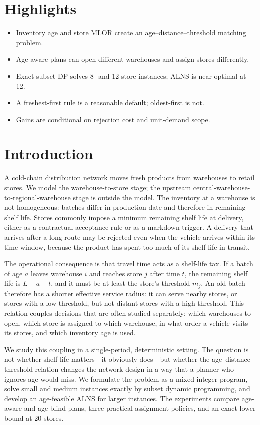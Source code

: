 \documentclass[preprint,12pt]{elsarticle}
\begin{document}
\section*{Highlights}
\begin{itemize}
\item Inventory age and store MLOR create an age--distance--threshold matching problem.
\item Age-aware plans can open different warehouses and assign stores differently.
\item Exact subset DP solves 8- and 12-store instances; ALNS is near-optimal at 12.
\item A freshest-first rule is a reasonable default; oldest-first is not.
\item Gains are conditional on rejection cost and unit-demand scope.
\end{itemize}

\section{Introduction}

A cold-chain distribution network moves fresh products from warehouses to retail stores. We model the warehouse-to-store stage; the upstream central-warehouse-to-regional-warehouse stage is outside the model. The inventory at a warehouse is not homogeneous: batches differ in production date and therefore in remaining shelf life. Stores commonly impose a minimum remaining shelf life at delivery, either as a contractual acceptance rule or as a markdown trigger. A delivery that arrives after a long route may be rejected even when the vehicle arrives within its time window, because the product has spent too much of its shelf life in transit.

The operational consequence is that travel time acts as a shelf-life tax. If a batch of age $a$ leaves warehouse $i$ and reaches store $j$ after time $t$, the remaining shelf life is $L-a-t$, and it must be at least the store's threshold $m_j$. An old batch therefore has a shorter effective service radius: it can serve nearby stores, or stores with a low threshold, but not distant stores with a high threshold. This relation couples decisions that are often studied separately: which warehouses to open, which store is assigned to which warehouse, in what order a vehicle visits its stores, and which inventory age is used.

We study this coupling in a single-period, deterministic setting. The question is not whether shelf life matters---it obviously does---but whether the age--distance--threshold relation changes the network design in a way that a planner who ignores age would miss. We formulate the problem as a mixed-integer program, solve small and medium instances exactly by subset dynamic programming, and develop an age-feasible ALNS for larger instances. The experiments compare age-aware and age-blind plans, three practical assignment policies, and an exact lower bound at 20 stores.
\end{document}
